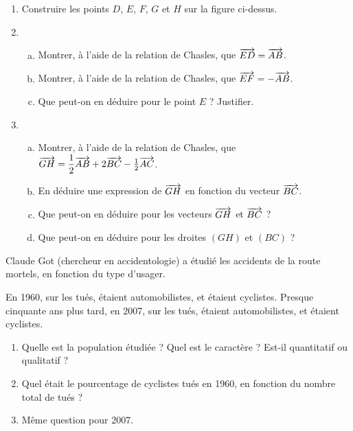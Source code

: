 \documentclass[12pt]{article}
\begin{document}
\begin{exercice}
  \begin{enumerate}[(1)]
      \item Construire les points $D$, $E$, $F$, $G$ et $H$ sur la figure ci-dessus.
      \item
      \begin{enumerate}[(a)]
        \item Montrer, à l'aide de la relation de Chasles, que $\overrightarrow{ED}=\overrightarrow{AB}$.
        \item Montrer, à l'aide de la relation de Chasles, que $\overrightarrow{EF}=-\overrightarrow{AB}$.
        \item Que peut-on en déduire pour le point $E$ ? Justifier.
      \end{enumerate}
      \item
      \begin{enumerate}[(a)]
        \item Montrer, à l'aide de la relation de Chasles, que $\overrightarrow{GH}=\dfrac{1}{2}\overrightarrow{AB}+2\overrightarrow{BC}-\frac{1}{2}\overrightarrow{AC}$.
        \item En déduire une expression de $\overrightarrow{GH}$ en fonction du vecteur $\overrightarrow{BC}$.
        \item Que peut-on en déduire pour les vecteurs $\overrightarrow{GH}$ et $\overrightarrow{BC}$ ?
        \item Que peut-on en déduire pour les droites $(GH)$ et $(BC)$ ?
      \end{enumerate}
  \end{enumerate}
\end{exercice}

\begin{exercice}
  Claude Got (chercheur en accidentologie) a étudié les accidents de la route
  mortels, en fonction du type d'usager.

  En 1960, sur les  tués,  étaient automobilistes, et  étaient
  cyclistes. Presque cinquante ans plus tard, en 2007, sur les  tués, 
    étaient automobilistes, et  étaient cyclistes.

  \begin{enumerate}[(1)]
    \item Quelle est la population étudiée ? Quel est le caractère ? Est-il quantitatif ou qualitatif ?
    \item Quel était le pourcentage de cyclistes tués en 1960, en fonction du nombre total de tués ?
    \item Même question pour 2007.
  \end{enumerate}
\end{exercice}
\end{document}
